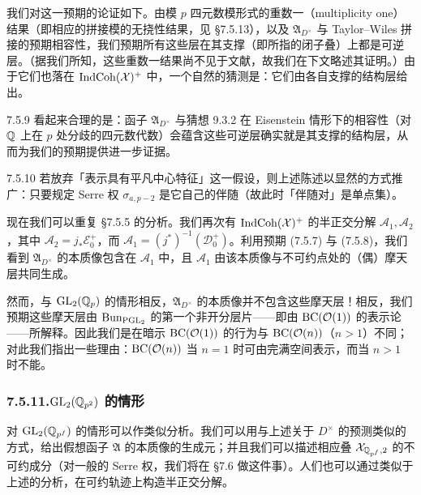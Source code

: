 我们对这一预期的论证如下。由模 $p$ 四元数模形式的重数一（multiplicity one）结果（即相应的拼接模的无挠性结果，见 §7.5.13），以及 $\mathfrak A_{D^\times}$ 与 Taylor--Wiles 拼接的预期相容性，我们预期所有这些层在其支撑（即所指的闭子叠）上都是可逆层。（据我们所知，这些重数一结果尚不见于文献，故我们在下文略述其证明。）由于它们也落在 $\operatorname{IndCoh}(\mathcal{X})^{+}$ 中，一个自然的猜测是：它们由各自支撑的结构层给出。

\begin{rem}{7.5.9}\label{thm:a4-7-5-9}
看起来合理的是：函子 $\mathfrak A_{D^\times}$ 与猜想 9.3.2 在 Eisenstein 情形下的相容性（对 $\mathbb{Q}$ 上在 $p$ 处分歧的四元数代数）会蕴含这些可逆层确实就是其支撑的结构层，从而为我们的预期提供进一步证据。
\end{rem}

\begin{rem}{7.5.10}\label{thm:a4-7-5-10}
若放弃「表示具有平凡中心特征」这一假设，则上述陈述以显然的方式推广：只要规定 Serre 权 $\sigma_{a,p-2}$ 是它自己的伴随（故此时「伴随对」是单点集）。
\end{rem}

现在我们可以重复 §7.5.5 的分析。我们再次有 $\operatorname{IndCoh}(\mathcal{X})^{+}$ 的半正交分解 $\mathcal A_1,\mathcal A_2$，其中 $\mathcal A_2=j_*\mathcal E_0^{+}$，而 $\mathcal A_1=(j^*)^{-1}(\mathcal D_0^{+})$。利用预期 (7.5.7) 与 (7.5.8)，我们看到 $\mathfrak A_{D^\times}$ 的本质像包含在 $\mathcal A_1$ 中，且 $\mathcal A_1$ 由该本质像与不可约点处的（偶）摩天层共同生成。

然而，与 $\mathrm{GL}_2(\mathbb{Q}_p)$ 的情形相反，$\mathfrak A_{D^\times}$ 的本质像并不包含这些摩天层！相反，我们预期这些摩天层由 $\operatorname{Bun}_{\mathrm{PGL}_2}$ 的第一个非开分层片——即由 $\mathrm{BC}(\mathcal{O}(1))$ 的表示论——所解释。因此我们是在暗示 $\mathrm{BC}(\mathcal{O}(1))$ 的行为与 $\mathrm{BC}(\mathcal{O}(n))$（$n>1$）不同；对此我们指出一些理由：$\mathrm{BC}(\mathcal{O}(n))$ 当 $n=1$ 时可由完满空间表示，而当 $n>1$ 时不能。

\subsubsection*{7.5.11.\quad $\mathrm{GL}_2(\mathbb{Q}_{p^2})$ 的情形}
对 $\mathrm{GL}_2(\mathbb{Q}_{p^f})$ 的情形可以作类似分析。我们可以用与上述关于 $D^\times$ 的预测类似的方式，给出假想函子 $\mathfrak A$ 的本质像的生成元；并且我们可以描述相应叠 $\mathcal{X}_{\mathbb{Q}_{p^f},2}$ 的不可约成分（对一般的 Serre 权，我们将在 §7.6 做这件事）。人们也可以通过类似于上述的分析，在可约轨迹上构造半正交分解。

